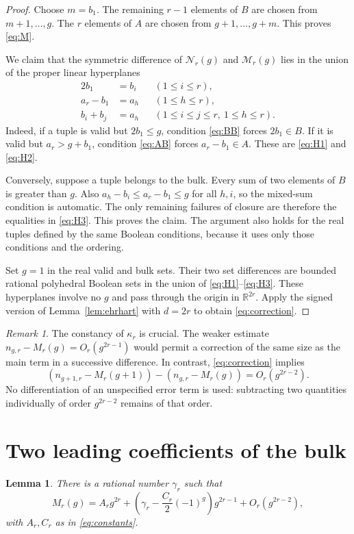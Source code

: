 \documentclass[11pt]{article}
\newtheorem{lemma}[theorem]{Lemma}
\theoremstyle{remark}\newtheorem{remark}[theorem]{Remark}
\newcommand{\R}{\mathbb R}
\begin{document}
\begin{proof}
Choose $m=b_1$. The remaining $r-1$ elements of $B$ are chosen from $m+1,\ldots,g$. The $r$ elements of $A$ are chosen from $g+1,\ldots,g+m$. This proves \eqref{eq:M}.

We claim that the symmetric difference of $\mathcal N_r(g)$ and $\mathcal M_r(g)$ lies in the union of the proper linear hyperplanes
\begin{align}
 2b_1&=b_i &&(1\le i\le r),\label{eq:H1}\\
 a_r-b_1&=a_h &&(1\le h\le r),\label{eq:H2}\\
 b_i+b_j&=a_h &&(1\le i\le j\le r,\ 1\le h\le r).\label{eq:H3}
\end{align}
Indeed, if a tuple is valid but $2b_1\le g$, condition \eqref{eq:BB} forces $2b_1\in B$. If it is valid but $a_r>g+b_1$, condition \eqref{eq:AB} forces $a_r-b_1\in A$. These are \eqref{eq:H1} and \eqref{eq:H2}.

Conversely, suppose a tuple belongs to the bulk. Every sum of two elements of $B$ is greater than $g$. Also $a_h-b_i\le a_r-b_1\le g$ for all $h,i$, so the mixed-sum condition is automatic. The only remaining failures of closure are therefore the equalities in \eqref{eq:H3}. This proves the claim. The argument also holds for the real tuples defined by the same Boolean conditions, because it uses only those conditions and the ordering.

Set $g=1$ in the real valid and bulk sets. Their two set differences are bounded rational polyhedral Boolean sets in the union of \eqref{eq:H1}--\eqref{eq:H3}. These hyperplanes involve no $g$ and pass through the origin in $\R^{2r}$. Apply the signed version of Lemma~\ref{lem:ehrhart} with $d=2r$ to obtain \eqref{eq:correction}.
\end{proof}

\begin{remark}\label{rem:constant}
The constancy of $\kappa_r$ is crucial. The weaker estimate $n_{g,r}-M_r(g)=O_r(g^{2r-1})$ would permit a correction of the same size as the main term in a successive difference. In contrast, \eqref{eq:correction} implies
\[
 (n_{g+1,r}-M_r(g+1))-(n_{g,r}-M_r(g))=O_r(g^{2r-2}).
\]
No differentiation of an unspecified error term is used: subtracting two quantities individually of order $g^{2r-2}$ remains of that order.
\end{remark}

\section{Two leading coefficients of the bulk}
\begin{lemma}\label{lem:asymp}
There is a rational number $\gamma_r$ such that
\begin{equation}\label{eq:bulkexp}
 M_r(g)=A_r g^{2r}
       +\left(\gamma_r-\frac{C_r}{2}(-1)^g\right)g^{2r-1}
       +O_r(g^{2r-2}),
\end{equation}
with $A_r,C_r$ as in \eqref{eq:constants}.
\end{lemma}
\end{document}
